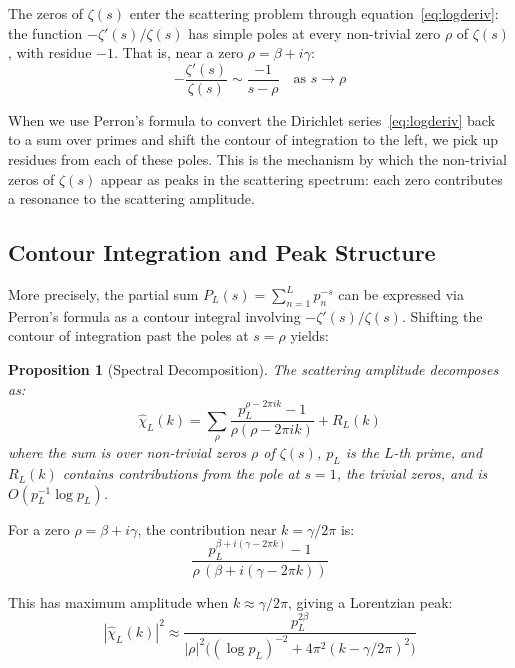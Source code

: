 \documentclass[11pt, oneside]{article}
\newtheorem{proposition}[theorem]{Proposition}
\theoremstyle{definition}
\begin{document}
The zeros of $\zeta(s)$ enter the scattering problem through
equation~\eqref{eq:logderiv}: the function $-\zeta'(s)/\zeta(s)$
has simple poles at every non-trivial zero $\rho$ of $\zeta(s)$,
with residue $-1$. That is, near a zero $\rho = \beta + i\gamma$:
\begin{equation}
-\frac{\zeta'(s)}{\zeta(s)} \sim \frac{-1}{s - \rho}
  \quad \text{as } s \to \rho
\end{equation}

When we use Perron's formula to convert the Dirichlet
series~\eqref{eq:logderiv} back to a sum over primes and shift the
contour of integration to the left, we pick up residues from each
of these poles. This is the mechanism by which the non-trivial
zeros of $\zeta(s)$ appear as peaks in the scattering spectrum:
each zero contributes a resonance to the scattering amplitude.

\subsection{Contour Integration and Peak Structure}

More precisely, the partial sum $P_L(s) = \sum_{n=1}^L p_n^{-s}$
can be expressed via Perron's formula as a contour integral
involving $-\zeta'(s)/\zeta(s)$. Shifting the contour of
integration past the poles at $s = \rho$ yields:

\begin{proposition}[Spectral Decomposition]
\label{prop:spectral}
The scattering amplitude decomposes as:
\begin{equation}
\hat{\chi}_L(k) = \sum_{\rho}
  \frac{p_L^{\rho - 2\pi i k} - 1}{\rho(\rho - 2\pi i k)}
  + R_L(k)
\end{equation}
where the sum is over non-trivial zeros $\rho$ of $\zeta(s)$,
$p_L$ is the $L$-th prime, and $R_L(k)$ contains contributions
from the pole at $s=1$, the trivial zeros, and is
$O(p_L^{-1}\log p_L)$.
\end{proposition}

For a zero $\rho = \beta + i\gamma$, the contribution near
$k = \gamma/2\pi$ is:
\begin{equation}
\frac{p_L^{\beta + i(\gamma - 2\pi k)} - 1}
     {\rho\,(\beta + i(\gamma - 2\pi k))}
\end{equation}

This has maximum amplitude when $k \approx \gamma/2\pi$, giving
a Lorentzian peak:
\begin{equation}
\label{eq:lorentzian}
|\hat{\chi}_L(k)|^2 \approx
  \frac{p_L^{2\beta}}
       {|\rho|^2\bigl((\log p_L)^{-2}
        + 4\pi^2(k - \gamma/2\pi)^2\bigr)}
\end{equation}
\end{document}
